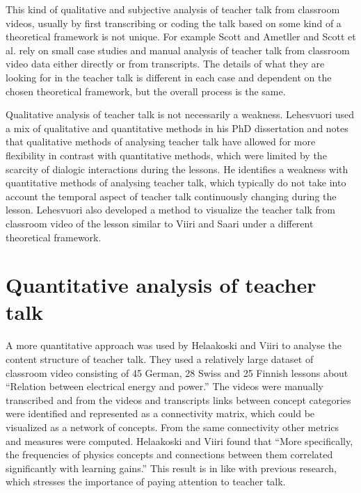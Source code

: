 \documentclass[utf8,english]{gradu3}
\begin{document}
This kind of qualitative and subjective analysis of teacher talk from classroom videos, usually by first transcribing or coding the talk based on some kind of a theoretical framework is not unique. For example Scott and Ametller \parencite*{scottTeachingScienceMeaningful2007} and Scott et al. \parencite*{scottPedagogicalLinkMaking2011} rely on small case studies and manual analysis of teacher talk from classroom video data either directly or from transcripts. The details of what they are looking for in the teacher talk is different in each case and dependent on the chosen theoretical framework, but the overall process is the same.

Qualitative analysis of teacher talk is not necessarily a weakness. Lehesvuori \parencite*{lehesvuoriDialogicTeachingScience2013} used a mix of qualitative and quantitative methods in his PhD dissertation and notes that qualitative methods of analysing teacher talk have allowed for more flexibility in contrast with quantitative methods, which were limited by the scarcity of dialogic interactions during the lessons. He identifies a weakness with quantitative methods of analysing teacher talk, which typically do not take into account the temporal aspect of teacher talk continuously changing during the lesson. Lehesvuori \parencite*{lehesvuoriVisualizingCommunicationStructures2013} also developed a method to visualize the teacher talk from classroom video of the lesson similar to Viiri and Saari \parencite*{viiriTeacherTalkPatterns2006} under a different theoretical framework.

\section{Quantitative analysis of teacher talk}
A more quantitative approach was used by Helaakoski and Viiri \parencite{helaakoskiContentContentStructure2014} to analyse the content structure of teacher talk. They used a relatively large dataset of classroom video consisting of 45 German, 28 Swiss and 25 Finnish lessons about \enquote{Relation  between  electrical  energy  and  power.} The videos were manually transcribed and from the videos and transcripts links between concept categories were identified and represented as a connectivity matrix, which could be visualized as a network of concepts. From the same connectivity other metrics and measures were computed. Helaakoski and Viiri \parencite*{helaakoskiContentContentStructure2014} found that \enquote{More  specifically,  the  frequencies  of  physics  concepts  and  connections  between  them  correlated  significantly  with  learning  gains.} This result is in like with previous research, which stresses the importance of paying attention to teacher talk. \parencite{viiriTeacherTalkPatterns2006,scottTeachingScienceMeaningful2007,scottPedagogicalLinkMaking2011}
\end{document}
